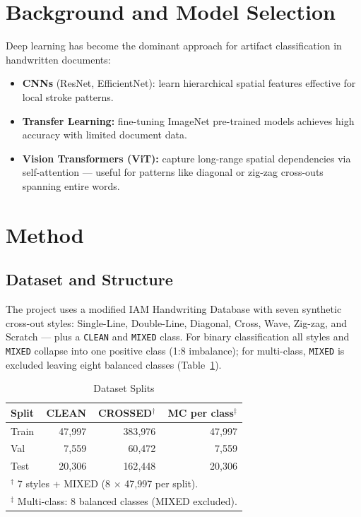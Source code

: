 \documentclass[12pt, a4paper]{article}
\begin{document}
\section{Background and Model Selection}
\label{sec:lit_review}

Deep learning has become the dominant approach for artifact classification in handwritten documents:
\begin{itemize}
    \item \textbf{CNNs} (ResNet, EfficientNet): learn hierarchical spatial features effective for local stroke patterns.
    \item \textbf{Transfer Learning:} fine-tuning ImageNet pre-trained models achieves high accuracy with limited document data.
    \item \textbf{Vision Transformers (ViT):} capture long-range spatial dependencies via self-attention — useful for patterns like diagonal or zig-zag cross-outs spanning entire words.
\end{itemize}

\section{Method}
\label{sec:method}

\subsection{Dataset and Structure}

The project uses a modified IAM Handwriting Database \cite{iam_db} with seven synthetic cross-out styles: Single-Line, Double-Line, Diagonal, Cross, Wave, Zig-zag, and Scratch — plus a \texttt{CLEAN} and \texttt{MIXED} class. For binary classification all styles and \texttt{MIXED} collapse into one positive class (1:8 imbalance); for multi-class, \texttt{MIXED} is excluded leaving eight balanced classes (Table~\ref{tab:dataset_splits}).

\begin{table}[H]
\centering
\caption{Dataset Splits}
\label{tab:dataset_splits}
\begin{tabular}{lrrr}
\toprule
\textbf{Split} & \textbf{CLEAN} & \textbf{CROSSED$^\dagger$} & \textbf{MC per class$^\ddagger$} \\ \midrule
Train & 47{,}997 & 383{,}976 & 47{,}997 \\
Val   & 7{,}559  & 60{,}472  & 7{,}559  \\
Test  & 20{,}306 & 162{,}448 & 20{,}306 \\ \bottomrule
\multicolumn{4}{l}{\footnotesize $^\dagger$ 7 styles + MIXED (8 $\times$ 47,997 per split).} \\
\multicolumn{4}{l}{\footnotesize $^\ddagger$ Multi-class: 8 balanced classes (MIXED excluded).}
\end{tabular}
\end{table}
\end{document}
